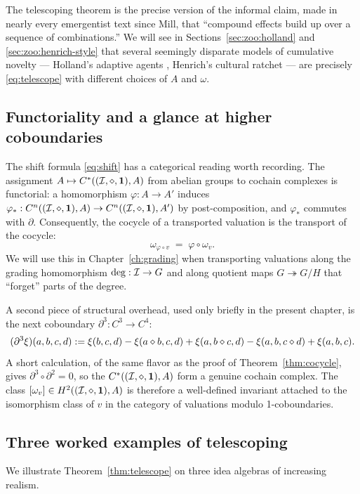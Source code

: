 The telescoping theorem is the precise version of the informal claim, made
in nearly every emergentist text since Mill, that ``compound effects build
up over a sequence of combinations.'' We will see in
Sections~\ref{sec:zoo:holland} and \ref{sec:zoo:henrich-style} that
several seemingly disparate models of cumulative novelty --- Holland's
adaptive agents \cite{Holland1998}, Henrich's cultural ratchet
\cite{Henrich2015} --- are precisely \eqref{eq:telescope} with different
choices of $A$ and $\omega$.

\subsection*{Functoriality and a glance at higher coboundaries}

The shift formula \eqref{eq:shift} has a categorical reading worth
recording. The assignment $A \mapsto C^*((\mathcal{I},\mathbin{\diamond},\mathbf{1}), A)$ from abelian groups to
cochain complexes is functorial: a homomorphism $\varphi : A \to A'$
induces $\varphi_* : C^n((\mathcal{I},\mathbin{\diamond},\mathbf{1}), A) \to C^n((\mathcal{I},\mathbin{\diamond},\mathbf{1}), A')$ by
post-composition, and $\varphi_*$ commutes with $\partial$. Consequently,
the cocycle of a transported valuation is the transport of the cocycle:
\[
  \omega_{\varphi\circ v} \;=\; \varphi \circ \omega_v.
\]
We will use this in Chapter~\ref{ch:grading} when transporting valuations
along the grading homomorphism $\deg : \mathcal{I} \to G$ and along quotient
maps $G \twoheadrightarrow G/H$ that ``forget'' parts of the degree.

A second piece of structural overhead, used only briefly in the present
chapter, is the next coboundary $\partial^3 : C^3 \to C^4$:
\[
  (\partial^3 \xi)(a,b,c,d) := \xi(b,c,d) - \xi(a\mathbin{\diamond} b, c, d) +
  \xi(a, b\mathbin{\diamond} c, d) - \xi(a, b, c\mathbin{\diamond} d) + \xi(a,b,c).
\]
A short calculation, of the same flavor as the proof of
Theorem~\ref{thm:cocycle}, gives $\partial^3 \circ \partial^2 = 0$, so the
$C^*((\mathcal{I},\mathbin{\diamond},\mathbf{1}), A)$ form a genuine cochain complex. The class $[\omega_v] \in
H^2((\mathcal{I},\mathbin{\diamond},\mathbf{1}), A)$ is therefore a well-defined invariant attached to the
isomorphism class of $v$ in the category of valuations modulo
1-coboundaries.

\subsection*{Three worked examples of telescoping}\label{sec:tele-examples}

We illustrate Theorem~\ref{thm:telescope} on three idea algebras of
increasing realism.

